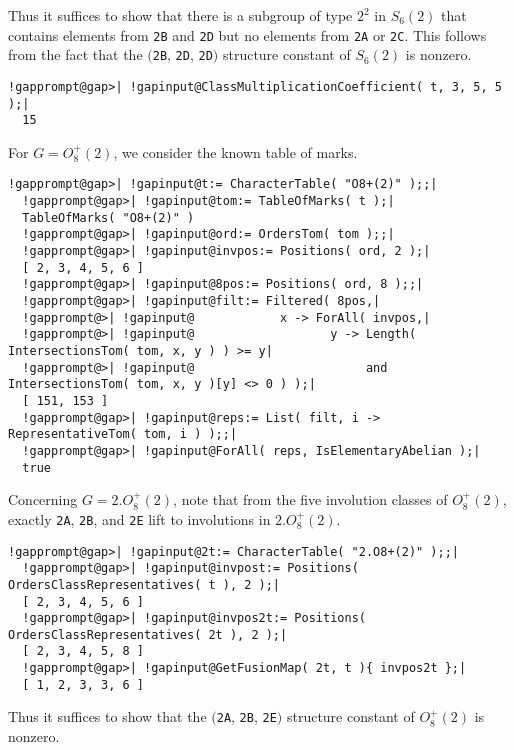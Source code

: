 \documentclass[a4paper,11pt]{report}
\begin{document}
{{{ Thus it suffices to show that there is a subgroup of type $2^2$ in $S_6(2)$ that contains elements from \texttt{2B} and \texttt{2D} but no elements from \texttt{2A} or \texttt{2C}. This follows from the fact that the $($\texttt{2B}, \texttt{2D}, \texttt{2D}$)$ structure constant of $S_6(2)$ is nonzero. 
\begin{Verbatim}[commandchars=!@|,fontsize=\small,frame=single,label=Example]
  !gapprompt@gap>| !gapinput@ClassMultiplicationCoefficient( t, 3, 5, 5 );|
  15
\end{Verbatim}
 

 For $G = O_8^+(2)$, we consider the known table of marks. 

 
\begin{Verbatim}[commandchars=!@|,fontsize=\small,frame=single,label=Example]
  !gapprompt@gap>| !gapinput@t:= CharacterTable( "O8+(2)" );;|
  !gapprompt@gap>| !gapinput@tom:= TableOfMarks( t );|
  TableOfMarks( "O8+(2)" )
  !gapprompt@gap>| !gapinput@ord:= OrdersTom( tom );;|
  !gapprompt@gap>| !gapinput@invpos:= Positions( ord, 2 );|
  [ 2, 3, 4, 5, 6 ]
  !gapprompt@gap>| !gapinput@8pos:= Positions( ord, 8 );;|
  !gapprompt@gap>| !gapinput@filt:= Filtered( 8pos,|
  !gapprompt@>| !gapinput@            x -> ForAll( invpos,|
  !gapprompt@>| !gapinput@                   y -> Length( IntersectionsTom( tom, x, y ) ) >= y|
  !gapprompt@>| !gapinput@                        and IntersectionsTom( tom, x, y )[y] <> 0 ) );|
  [ 151, 153 ]
  !gapprompt@gap>| !gapinput@reps:= List( filt, i -> RepresentativeTom( tom, i ) );;|
  !gapprompt@gap>| !gapinput@ForAll( reps, IsElementaryAbelian );|
  true
\end{Verbatim}
 

 Concerning $G = 2.O_8^+(2)$, note that from the five involution classes of $O_8^+(2)$, exactly \texttt{2A}, \texttt{2B}, and \texttt{2E} lift to involutions in $2.O_8^+(2)$. 

 
\begin{Verbatim}[commandchars=!@|,fontsize=\small,frame=single,label=Example]
  !gapprompt@gap>| !gapinput@2t:= CharacterTable( "2.O8+(2)" );;|
  !gapprompt@gap>| !gapinput@invpost:= Positions( OrdersClassRepresentatives( t ), 2 );|
  [ 2, 3, 4, 5, 6 ]
  !gapprompt@gap>| !gapinput@invpos2t:= Positions( OrdersClassRepresentatives( 2t ), 2 );|
  [ 2, 3, 4, 5, 8 ]
  !gapprompt@gap>| !gapinput@GetFusionMap( 2t, t ){ invpos2t };|
  [ 1, 2, 3, 3, 6 ]
\end{Verbatim}
 

 Thus it suffices to show that the $($\texttt{2A}, \texttt{2B}, \texttt{2E}$)$ structure constant of $O_8^+(2)$ is nonzero. 

}}}
\end{document}
